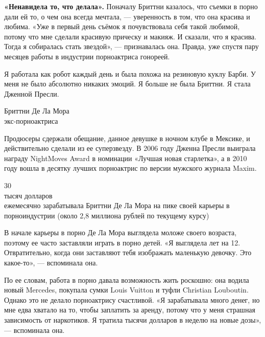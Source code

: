 \textbf{«Ненавидела то, что делала».} Поначалу Бриттни казалось, что съемки в порно дали ей то, о чем она всегда мечтала, --- уверенность в том, что она красива и любима. «Уже в первый день съёмок я почувствовала себя такой любимой, потому что мне сделали красивую прическу и макияж. И сказали, что я красива. Тогда я собиралась стать звездой», --- признавалась она. Правда, уже спустя пару месяцев работы в индустрии порноактриса  гонореей.

\begin{fancyquotes}
    Я работала как робот каждый день и была похожа на резиновую куклу Барби. У меня не было абсолютно никаких эмоций. Я больше не была Бриттни. Я стала Дженной Пресли.\\

    \begin{flushright}
        Бриттни Де Ла Мора\\
        экс-порноактриса
    \end{flushright}
\end{fancyquotes}

Продюсеры сдержали обещание, данное девушке в ночном клубе в Мексике, и действительно сделали из ее суперзвезду. В 2006 году Дженна Пресли выиграла награду NightMoves Award в номинации «Лучшая новая старлетка», а в 2010 году вошла в десятку лучших порноактрис по версии мужского журнала Maxim.

\newpage

\begin{center}

    {\Huge 30}\\
    {\Large тысяч долларов}\\[1em]

    {\large ежемесячно зарабатывала Бриттни Де Ла Мора на пике своей карьеры в порноиндустрии (около 2,8 миллиона рублей по текущему курсу)}
\end{center}

В начале карьеры в порно Де Ла Мора выглядела моложе своего возраста, поэтому ее часто заставляли играть в порно детей. «Я выглядела лет на 12. Отвратительно, когда они заставляют тебя изображать маленькую девочку. Это  какое-то», --- вспоминала она.

По ее словам, работа в порно давала возможность жить роскошно: она водила новый Mercedes, покупала сумки Louis Vuitton и туфли Christian Louboutin. Однако это не делало порноактрису счастливой. «Я зарабатывала много денег, но мне едва хватало на то, чтобы заплатить за аренду, потому что у меня страшная зависимость от наркотиков. Я тратила тысячи долларов в неделю на новые дозы», — вспоминала она.

